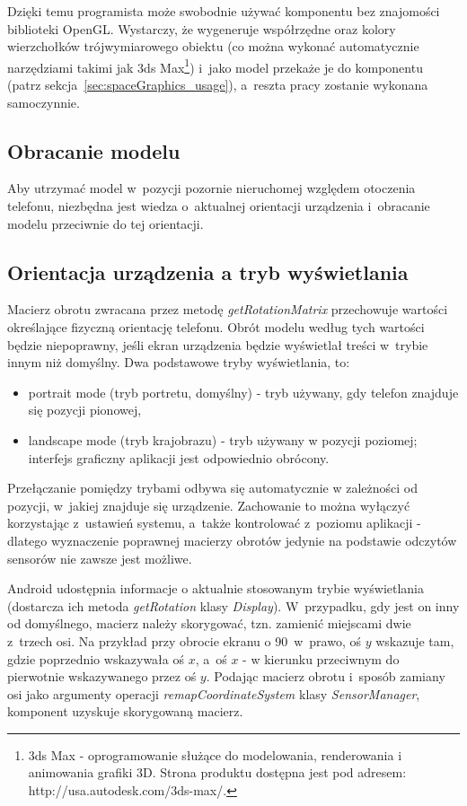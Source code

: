\documentclass[a4paper,twocolumn,11pt]{article}
\begin{document}
 Dzięki temu programista może swobodnie używać komponentu bez znajomości biblioteki OpenGL.
 Wystarczy, że wygeneruje współrzędne oraz kolory wierzchołków trójwymiarowego obiektu (co można wykonać automatycznie narzędziami takimi jak 3ds Max\footnote{3ds Max - oprogramowanie służące do modelowania, renderowania i animowania grafiki 3D. Strona produktu dostępna jest pod adresem: http://usa.autodesk.com/3ds-max/.}) i~jako model przekaże je do komponentu (patrz sekcja~\ref{sec:spaceGraphics_usage}), a~reszta pracy zostanie wykonana samoczynnie.

\subsection{Obracanie modelu}
 Aby utrzymać model w~pozycji pozornie nieruchomej względem otoczenia telefonu, niezbędna jest wiedza o~aktualnej orientacji urządzenia i~obracanie modelu przeciwnie do tej orientacji.

\subsection{Orientacja urządzenia a tryb wyświetlania}
 Macierz obrotu zwracana przez metodę \emph{getRotationMatrix} przechowuje wartości określające fizyczną orientację telefonu.
 Obrót modelu według tych wartości będzie niepoprawny, jeśli ekran urządzenia będzie wyświetlał treści w~trybie innym niż domyślny.
 Dwa podstawowe tryby wyświetlania, to:
 \begin{itemize}
  \item portrait mode (tryb portretu, domyślny) - tryb używany, gdy telefon znajduje się pozycji pionowej,
  \item landscape mode (tryb krajobrazu) - tryb używany w pozycji poziomej; interfejs graficzny aplikacji jest odpowiednio obrócony.
 \end{itemize}
 
 Przełączanie pomiędzy trybami odbywa się automatycznie w zależności od pozycji, w~jakiej znajduje się urządzenie.
 Zachowanie to można wyłączyć korzystając z~ustawień systemu, a~także kontrolować z~poziomu aplikacji - dlatego wyznaczenie poprawnej macierzy obrotów jedynie na podstawie odczytów sensorów nie zawsze jest możliwe.
 
 Android udostępnia informacje o aktualnie stosowanym trybie wyświetlania (dostarcza ich metoda \emph{getRotation} klasy \emph{Display}).
 W~przypadku, gdy jest on inny od domyślnego, macierz należy skorygować, tzn. zamienić miejscami dwie z~trzech osi.
 Na przykład przy obrocie ekranu o 90\textdegree~w~prawo, oś $y$ wskazuje tam, gdzie poprzednio wskazywała oś $x$, a~oś $x$ - w kierunku przeciwnym do pierwotnie wskazywanego przez oś $y$.
 Podając macierz obrotu i~sposób zamiany osi jako argumenty operacji \emph{remapCoordinateSystem} klasy \emph{SensorManager}, komponent uzyskuje skorygowaną macierz.
\end{document}
